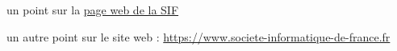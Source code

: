   \item un point sur la \href{https://www.societe-informatique-de-france.fr}{page web de la SIF}
  \item un autre point sur le site web : \url{https://www.societe-informatique-de-france.fr}
